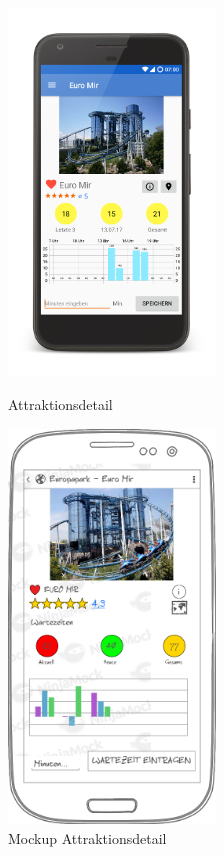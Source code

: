 \begin{figure}[h]
    \centering
    \begin{minipage}{0.49\textwidth}
        \centering
        \includegraphics[width=0.49\textwidth, trim=150 200 200 200, 
        clip]{img/screenshots/ss_attraktionsdetail.png}
        \caption{Attraktionsdetail}
		\label{figure:implementierungattraktionsansicht}
    \end{minipage}
    \begin{minipage}{0.49\textwidth}
    	\centering
		\includegraphics[width=0.49\textwidth]{img/mockups/m_attraktionsdetail.png}
		\caption{Mockup Attraktionsdetail}
    \end{minipage}
\end{figure} 

